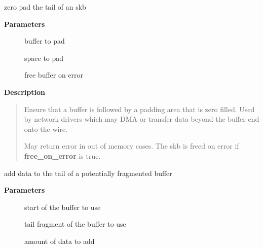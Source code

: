 \documentclass[a4paper,8pt,english]{sphinxmanual}
\begin{document}
\begin{fulllineitems}
\label{networking/kapi:c.__skb_pad}
zero pad the tail of an skb

\end{fulllineitems}


\textbf{Parameters}
\begin{description}
\item[{}] \leavevmode
buffer to pad

\item[{}] \leavevmode
space to pad

\item[{}] \leavevmode
free buffer on error

\end{description}

\textbf{Description}
\begin{quote}

Ensure that a buffer is followed by a padding area that is zero
filled. Used by network drivers which may DMA or transfer data
beyond the buffer end onto the wire.

May return error in out of memory cases. The skb is freed on error
if \textbf{free\_on\_error} is true.
\end{quote}

\begin{fulllineitems}
\label{networking/kapi:c.pskb_put}
add data to the tail of a potentially fragmented buffer

\end{fulllineitems}


\textbf{Parameters}
\begin{description}
\item[{}] \leavevmode
start of the buffer to use

\item[{}] \leavevmode
tail fragment of the buffer to use

\item[{}] \leavevmode
amount of data to add

\end{description}
\end{document}
